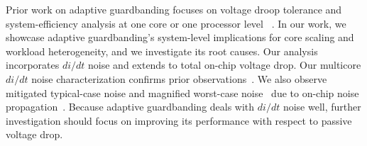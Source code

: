 Prior work on adaptive guardbanding focuses on voltage droop tolerance and system-efficiency analysis at one core or one processor level ~\cite{fischer200590nm,tschanz2007adaptive,kurd2008next,lefurgy2011active,bowman201222nm,grenat20145,tokunaga20145,bowman20158}. In our work, we showcase adaptive guardbanding's system-level implications for core scaling and workload heterogeneity, and we investigate its root causes. Our analysis incorporates $di/dt$ noise and extends to total on-chip voltage drop. Our multicore $di/dt$ noise characterization confirms prior observations~\cite{gupta2007understanding,reddi2010voltage,miller2012vrsync}. We also observe mitigated typical-case noise and magnified worst-case noise~\cite{miller2012vrsync} due to on-chip noise propagation~\cite{gupta2007understanding,reddi2010voltage}. Because adaptive guardbanding deals with $di/dt$ noise well, further investigation should focus on improving its performance with respect to passive voltage drop.